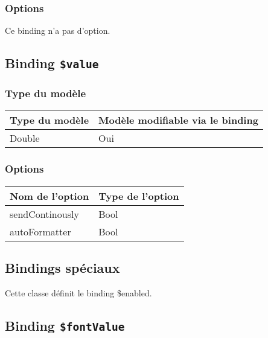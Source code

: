 \subsubsection{Options}

Ce binding n'a pas d'option.









\subsection{Binding \texttt{\$value}}

\subsubsection{Type du modèle}

\begin{tabular}{|l|l|}
\hline
\textbf{Type du modèle} & \textbf{Modèle modifiable via le binding}\\
\hline
Double & Oui\\
\hline
\end{tabular}
\subsubsection{Options}

\begin{tabular}{|l|l|}
\hline
\textbf{Nom de l'option} & \textbf{Type de l'option}\\
\hline
sendContinously & Bool\\
\hline
autoFormatter & Bool\\
\hline
\end{tabular}








\subsection{Bindings spéciaux}

Cette classe définit le binding \$enabled.

\subsection{Binding \texttt{\$fontValue}}

